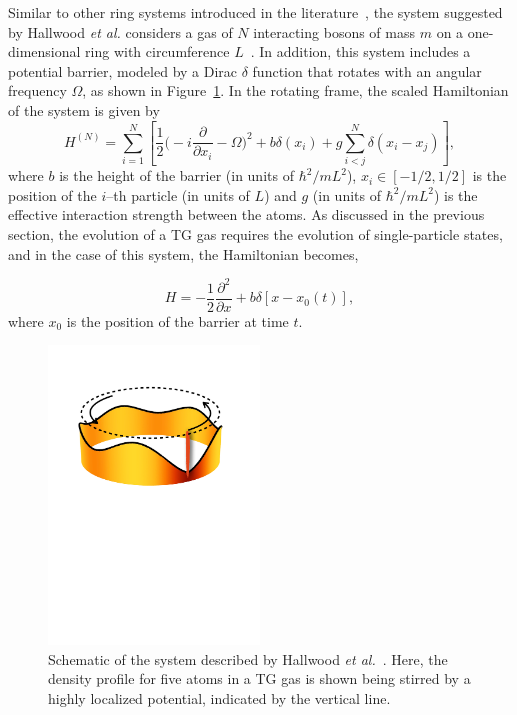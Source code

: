 Similar to other ring systems introduced in the literature~\cite{das2002,girardeau2009}, the system suggested by Hallwood \textit{et al.} considers a gas of $N$ interacting bosons of mass $m$ on a one-dimensional ring with circumference $L$~\cite{hallwood2010}.
In addition, this system includes a potential barrier, modeled by a Dirac $\delta$ function that rotates with an angular frequency $\Omega$, as shown in Figure~\ref{fig:ring_scheme}.
In the rotating frame, the scaled Hamiltonian of the system is given by \cite{hallwood2010}
\begin{equation}H^{(N)} = \sum_{i=1} ^{N} \left[{\frac{1}{2}\bigg(-i\frac{\partial}{\partial x_i}-\Omega}\bigg)^2 + b\delta(x_i) +g \sum_{i<j} ^{N} \delta (x_i - x_j )\right],
\end{equation}
\noindent where $b$ is the height of the barrier (in units of $\hbar^2/mL^2$), $x_i \in \left[-1/2,1/2\right]$ is the position of the $i$--th particle (in units of $L$) and $g$ (in units of $\hbar^2/mL^2$) is the effective interaction strength between the atoms.
As discussed in the previous section, the evolution of a TG gas requires the evolution of single-particle states, and in the case of this system, the Hamiltonian becomes,

\begin{equation}
H = -\frac{1}{2} \frac{\partial^2}{\partial x} + b\delta \left[ x-x_0(t) \right], 
\end{equation}
where $x_0$ is the position of the barrier at time $t$. 

\begin{figure}
\center \includegraphics[width = 0.5\textwidth]{data/1d/scheme.pdf}
\caption{Schematic of the system described by Hallwood \textit{et al.}~\cite{hallwood2010}.
Here, the density profile for five atoms in a TG gas is shown being stirred by a highly localized potential, indicated by the vertical line.}
\label{fig:ring_scheme}
\end{figure}

